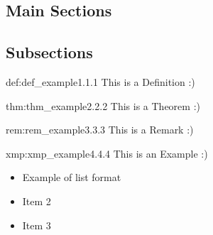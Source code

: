 \documentclass[landscape, 8pt]{extarticle}
\begin{document}
\setlength{\abovedisplayskip}{3.5pt}
\setlength{\belowdisplayskip}{3.5pt}
\setlength{\abovedisplayshortskip}{3.5pt}
\setlength{\belowdisplayshortskip}{3.5pt}

\begin{multicols}{3}
\raggedcolumns %
\section{\huge Main Sections}
\vspace{-5pt}

\subsection*{Subsections}

\begin{dfn}{def:def_example}{1.1.1}
This is a Definition :)
\end{dfn}
\vspace{-5pt}

\begin{thm}{thm:thm_example}{2.2.2}
This is a Theorem :)
\end{thm}
\vspace{-5pt}

\begin{rem}{rem:rem_example}{3.3.3}
This is a Remark :)
\end{rem}
\vspace{-5pt}

\begin{xmp}{xmp:xmp_example}{4.4.4}
This is an Example :)
\renewcommand\labelitemi{\tiny$\bullet$}
\begin{itemize}
    \setlength\itemsep{0em}
    \item Example of list format
    \item Item 2
    \item Item 3
\end{itemize}
\end{xmp}
\vspace{-5pt}




\end{multicols}
\end{document}
